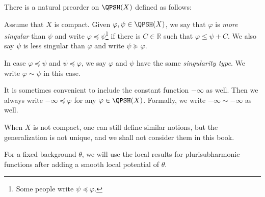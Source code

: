 There is a natural preorder on $\QPSH(X)$ defined as follows:
\begin{definition}\label{def:parorder}Assume that $X$ is compact.
    Given $\varphi,\psi\in \QPSH(X)$, we say that $\varphi$ is \emph{more singular} than $\psi$ and write $\varphi\preceq \psi$\index{$\varphi\preceq \psi$}\footnote{Some people write $\psi\preceq \varphi$.} if there is $C\in \mathbb{R}$ such that $\varphi\leq \psi+C$. We also say $\psi$ is less singular than $\varphi$ and write $\psi\succeq \varphi$.

    In case $\varphi\preceq \psi$ and $\psi\preceq \varphi$, we say $\varphi$ and $\psi$ have the same \emph{singularity type}. We write $\varphi\sim \psi$ \index{$\varphi\sim \psi$} in this case.
\end{definition}
It is sometimes convenient to include the constant function $-\infty$ as well. Then we always write $-\infty\preceq \varphi$ for any $\varphi\in \QPSH(X)$. Formally, we write $-\infty\sim -\infty$ as well.

When $X$ is not compact, one can still define similar notions, but the generalization is not unique, and we shall not consider them in this book.
\begin{remark}
For a fixed background $\theta$, we will use the local results for plurisubharmonic functions after adding a smooth local potential of $\theta$.
\end{remark}




